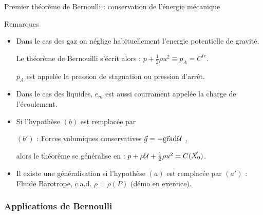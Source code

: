 \begin{frame}{Premier théorème de Bernoulli : conservation de l'énergie mécanique}

\bigskip
\pause

Remarques 

\begin{itemize}


\item Dans le cas des gaz on néglige habituellement l'energie potentielle de gravité.

Le théorème de Bernouilli s'écrit alors : $p+ \frac{1}{2} \rho u^2 \equiv p_A = C^{te}$.

$p_A$ est appelée la pression de stagnation ou pression d'arrêt.
  \pause
\item Dans le cas des liquides,  $e_m$ est aussi courrament appelée la charge de l'écoulement.


\pause
\item Si l'hypothèse $(b)$ est remplacée par 

$(b')$ : Forces volumiques conservatives  $\vec{g} = - \vec{\mbox{\rm gra}}\mbox{\rm d} {\cal U} $ , 

alors le théorème se généralise en :  
$p + \rho {\cal U} + \frac{1}{2} \rho u^2  = C(\vec{X_0})$. 
\pause
\item Il existe une généralisation si l'hypothèse $(a)$ est remplacée par 
$(a')$ : Fluide Barotrope,
c.a.d. $\rho = \rho(P)$ (démo en exercice).

\end{itemize}


\end{frame}


\subsubsection{Applications de Bernoulli}

